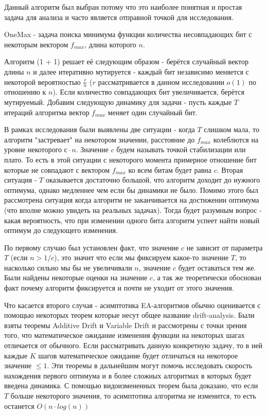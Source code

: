 \documentclass[times,specification,annotation]{itmo-student-thesis}
\begin{document}
    Данный алгоритм был выбран потому что это наиболее понятная и простая задача для анализа и часто является отправной точкой для исследования.

    OneMax - задача поиска минимума функции количества несовпадающих бит с некоторым вектором $f_{max}$, длина которого $n$.

    Алгоритм (1 + 1) решает её следующим образом - берётся случайный вектор длины $n$ и далее итеративно мутируется - каждый бит независимо меняется с некоторой вероятностью $\frac{r}{n}$ ($r$ рассматривается в данном исследовании $o(1)$ по отношению к $n$).
    Если количество совпадающих бит увеличивается, берётся мутируемый.
    Добавим следующую динамику для задачи - пусть каждые $T$ итераций алгоритма вектор $f_{max}$ меняет один случайный бит.

    В рамках исследования были выявлены две ситуации - когда $T$ слишком мала, то алгоритм "застревает"  на некотором значении, расстояние до $f_{max}$ колеблются на уровне некоторого $с \cdot n$.
    Значение $c$ будем называть точкой стабилизации или плато.
    То есть в этой ситуации с некоторого момента примерное отношение бит которые не совпадают с вектором $f_{max}$ ко всем битам будет равна $c$.
    Вторая ситуация - $T$ оказывается достаточно большой, что алгоритм доходит до нужного оптимума, однако медленнее чем если бы динамики не было.
    Помимо этого был рассмотрена ситуация когда алгоритм не заканчивается на достижении оптимума (что вполне можно увидеть на реальных задачах).
    Тогда будет разумным вопрос - какая вероятность, что при изменении одного бита алгоритм успеет найти новый оптимум до следующего изменения.

    По первому случаю был установлен факт, что значение $c$ не зависит от параметра $T$ (если $n > 1/c$), это значит что если мы фиксируем какое-то значение $T$, то насколько сильно мы бы не увеличивали $n$, значение $c$ будет оставаться тем же.
    Были найдены некоторые оценки на значение $c$, а так же теоретически обоснован факт почему алгоритм фиксируется и почти не уходит от этого значения.

    Что касается второго случая - асимптотика EA-алгоритмов обычно оценивается с помощью некоторых теорем которые несут общее название drift-analysis.
    Были взяты теоремы Additive Drift и Variable Drift и рассмотрены с точки зрения того, что математическое ожидание изменения функции на некоторых шагах отличается от обычного.
    Если рассматривать данную конкретную задачу, то в ней каждые $K$ шагов математическое ожидание будет отличаться на некоторое значение $\leq 1$.
    Эти теоремы в дальнейшим могут помочь исследовать скорость нахождения первого оптимума и в более сложных алгоритмах в которых будет введена динамика.
    С помощью видоизмененных теорем была доказано, что если $T$ больше некоторого значения, то асимптотика алгоритма не изменится, то есть останется $O(n \cdot log(n))$
\end{document}
